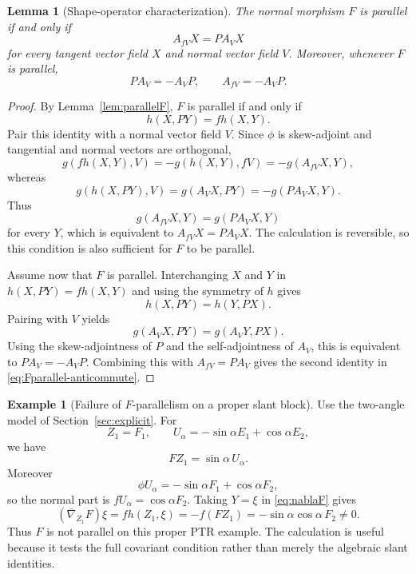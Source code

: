 \documentclass[11pt]{article}
\newtheorem{lemma}[theorem]{Lemma}\newtheorem{corollary}[theorem]{Corollary}
\theoremstyle{definition}\newtheorem{definition}[theorem]{Definition}\newtheorem{example}[theorem]{Example}
\theoremstyle{remark}\newtheorem{remark}[theorem]{Remark}
\begin{document}
\begin{lemma}[Shape-operator characterization]\label{lem:Fparallel-shape}
The normal morphism \(F\) is parallel if and only if
\begin{equation}\label{eq:Fparallel-shape}
 A_{fV}X=P A_VX
\end{equation}
for every tangent vector field \(X\) and normal vector field \(V\).
Moreover, whenever \(F\) is parallel,
\begin{equation}\label{eq:Fparallel-anticommute}
 PA_V=-A_VP,
 \qquad
 A_{fV}=-A_VP .
\end{equation}
\end{lemma}
\begin{proof}
By Lemma~\ref{lem:parallelF}, \(F\) is parallel if and only if
\[
 h(X,PY)=f h(X,Y).
\]
Pair this identity with a normal vector field \(V\). Since \(\phi\) is
skew-adjoint and tangential and normal vectors are orthogonal,
\[
 g(fh(X,Y),V)
 =-g(h(X,Y),fV)
 =-g(A_{fV}X,Y),
\]
whereas
\[
 g(h(X,PY),V)
 =g(A_VX,PY)
 =-g(PA_VX,Y).
\]
Thus
\[
 g(A_{fV}X,Y)=g(PA_VX,Y)
\]
for every \(Y\), which is equivalent to
\(A_{fV}X=PA_VX\).  The calculation is reversible, so this condition is
also sufficient for \(F\) to be parallel.

Assume now that \(F\) is parallel.  Interchanging \(X\) and \(Y\) in
\(h(X,PY)=fh(X,Y)\) and using the symmetry of \(h\) gives
\[
 h(X,PY)=h(Y,PX).
\]
Pairing with \(V\) yields
\[
 g(A_VX,PY)=g(A_VY,PX).
\]
Using the skew-adjointness of \(P\) and the self-adjointness of \(A_V\),
this is equivalent to \(PA_V=-A_VP\). Combining this with
\(A_{fV}=PA_V\) gives the second identity in
\eqref{eq:Fparallel-anticommute}.
\end{proof}

\begin{example}[Failure of $F$-parallelism on a proper slant block]\label{ex:Fparallel-failure}
Use the two-angle model of Section~\ref{sec:explicit}.  For
\[
 Z_1=F_1,\qquad U_\alpha=-\sin\alpha E_1+\cos\alpha E_2,
\]
we have
\[
 FZ_1=\sin\alpha\,U_\alpha.
\]
Moreover
\[
 \phi U_\alpha=-\sin\alpha F_1+\cos\alpha F_2,
\]
so the normal part is $fU_\alpha=\cos\alpha F_2$.  Taking $Y=\xi$ in \eqref{eq:nablaF} gives
\[
 (\bar\nabla_{Z_1}F)\xi=f h(Z_1,\xi)=-f(FZ_1)
 =-\sin\alpha\cos\alpha\,F_2\neq0.
\]
Thus $F$ is not parallel on this proper PTR example.  The calculation is useful because it tests the full covariant condition rather than merely the algebraic slant identities.
\end{example}
\end{document}
